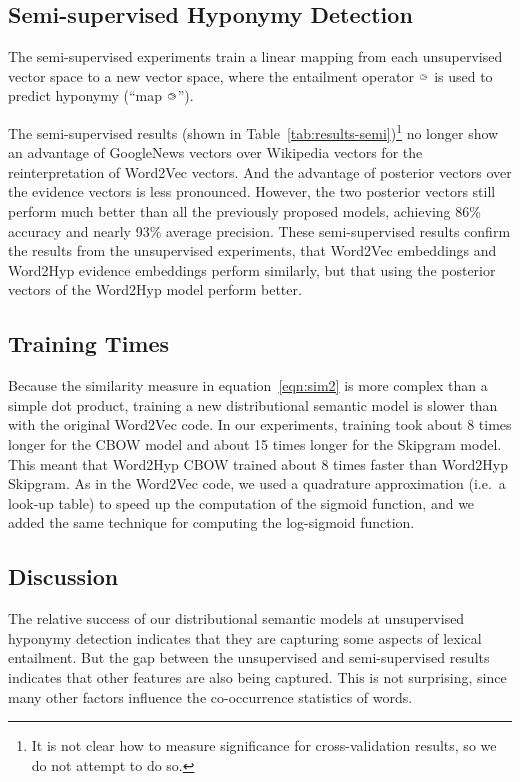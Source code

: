 \documentclass[11pt,a4paper]{article}
\newcommand{\bie}{{\raisebox{1.8pt}{\makebox[0pt][l]{\hspace{1.3pt}${\scriptscriptstyle >}$}${\scriptscriptstyle \bigcirc}$}}}
\begin{document}
\subsection{Semi-supervised Hyponymy Detection} %

The semi-supervised experiments train a linear mapping from
each unsupervised vector space to a new vector space, where the entailment
operator $\bie$ is used to predict hyponymy (``map $\bie$'').  


The semi-supervised results (shown in 
Table~\ref{tab:results-semi})\footnote{It is not clear how to measure
  significance for cross-validation results, so we do not attempt to do so.}
no longer show an advantage of GoogleNews vectors over Wikipedia
vectors for the reinterpretation of Word2Vec vectors.  And the advantage of
posterior vectors over the evidence vectors is less pronounced.  However, the
two posterior vectors still perform much better than all the previously
proposed models, achieving 86\% accuracy and nearly 93\% average precision.
These semi-supervised results confirm the results from the unsupervised
experiments, that Word2Vec embeddings and Word2Hyp evidence embeddings perform
similarly, but that using the posterior vectors of the Word2Hyp model perform
better.



\subsection{Training Times}

Because the similarity measure in equation~\ref{eqn:sim2} is more complex than a simple dot
product, training a new distributional semantic model is slower than with the
original Word2Vec code.  In our experiments, training took about 8 times
longer for the CBOW model and about 15 times longer for the Skipgram model.
This meant that Word2Hyp CBOW trained about 8 times faster than Word2Hyp
Skipgram.  As in the Word2Vec code, we used a quadrature approximation
(i.e.\ a look-up table) to speed up the computation of the sigmoid function,
and we added the same technique for computing the log-sigmoid function.



\subsection{Discussion}
\label{sec:discussion}

The relative success of our distributional semantic models at unsupervised
hyponymy detection indicates that they are capturing some aspects of lexical
entailment.  But the gap between the unsupervised and semi-supervised results
indicates that other features are also being captured.
This is not surprising, since many other factors influence the co-occurrence
statistics of words.
\end{document}
